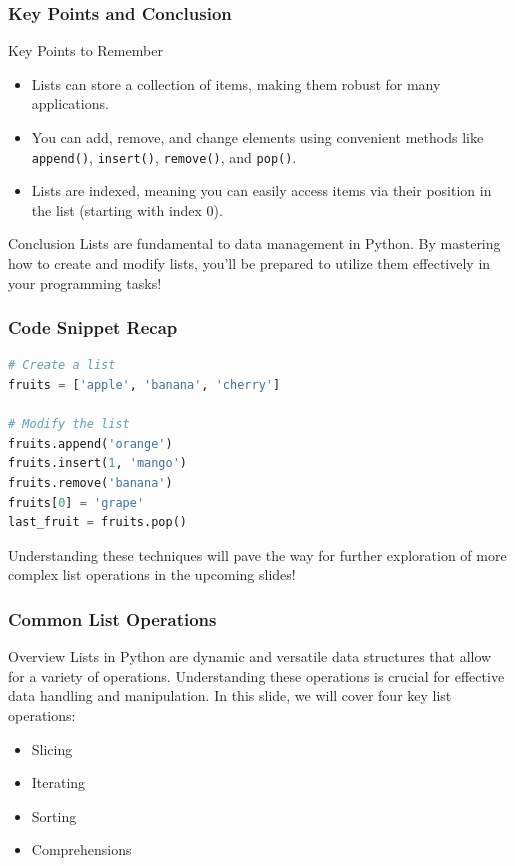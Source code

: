 \documentclass{beamer}
\begin{document}
\begin{frame}[fragile]
    \frametitle{Key Points and Conclusion}
    \begin{block}{Key Points to Remember}
        \begin{itemize}
            \item Lists can store a collection of items, making them robust for many applications.
            \item You can add, remove, and change elements using convenient methods like \texttt{append()}, \texttt{insert()}, \texttt{remove()}, and \texttt{pop()}.
            \item Lists are indexed, meaning you can easily access items via their position in the list (starting with index 0).
        \end{itemize}
    \end{block}
    
    \begin{block}{Conclusion}
        Lists are fundamental to data management in Python. By mastering how to create and modify lists, you’ll be prepared to utilize them effectively in your programming tasks!
    \end{block}
\end{frame}

\begin{frame}[fragile]
    \frametitle{Code Snippet Recap}
    \begin{lstlisting}[language=Python]
# Create a list
fruits = ['apple', 'banana', 'cherry']

# Modify the list
fruits.append('orange')
fruits.insert(1, 'mango')
fruits.remove('banana')
fruits[0] = 'grape'
last_fruit = fruits.pop()
    \end{lstlisting}
    
    Understanding these techniques will pave the way for further exploration of more complex list operations in the upcoming slides!
\end{frame}

\begin{frame}
    \frametitle{Common List Operations}
    \begin{block}{Overview}
        Lists in Python are dynamic and versatile data structures that allow for a variety of operations. Understanding these operations is crucial for effective data handling and manipulation. In this slide, we will cover four key list operations:
        \begin{itemize}
            \item Slicing
            \item Iterating
            \item Sorting
            \item Comprehensions
        \end{itemize}
    \end{block}
\end{frame}
\end{document}

